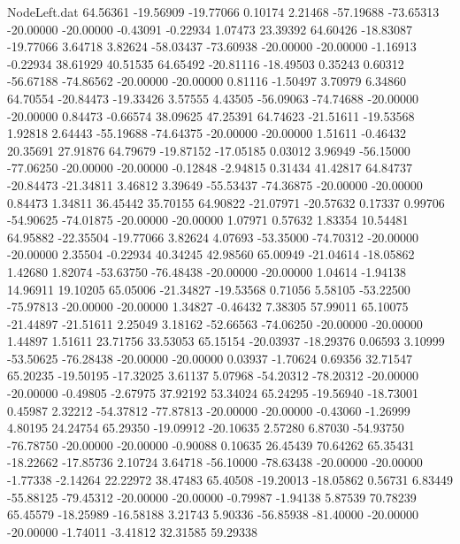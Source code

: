 \begin{filecontents}{NodeLeft.dat}
  64.56361  -19.56909  -19.77066     0.10174    2.21468  -57.19688  -73.65313  -20.00000  -20.00000   -0.43091   -0.22934    1.07473   23.39392
  64.60426  -18.83087  -19.77066     3.64718    3.82624  -58.03437  -73.60938  -20.00000  -20.00000   -1.16913   -0.22934   38.61929   40.51535
  64.65492  -20.81116  -18.49503     0.35243    0.60312  -56.67188  -74.86562  -20.00000  -20.00000    0.81116   -1.50497    3.70979    6.34860
  64.70554  -20.84473  -19.33426     3.57555    4.43505  -56.09063  -74.74688  -20.00000  -20.00000    0.84473   -0.66574   38.09625   47.25391
  64.74623  -21.51611  -19.53568     1.92818    2.64443  -55.19688  -74.64375  -20.00000  -20.00000    1.51611   -0.46432   20.35691   27.91876
  64.79679  -19.87152  -17.05185     0.03012    3.96949  -56.15000  -77.06250  -20.00000  -20.00000   -0.12848   -2.94815    0.31434   41.42817
  64.84737  -20.84473  -21.34811     3.46812    3.39649  -55.53437  -74.36875  -20.00000  -20.00000    0.84473    1.34811   36.45442   35.70155
  64.90822  -21.07971  -20.57632     0.17337    0.99706  -54.90625  -74.01875  -20.00000  -20.00000    1.07971    0.57632    1.83354   10.54481
  64.95882  -22.35504  -19.77066     3.82624    4.07693  -53.35000  -74.70312  -20.00000  -20.00000    2.35504   -0.22934   40.34245   42.98560
  65.00949  -21.04614  -18.05862     1.42680    1.82074  -53.63750  -76.48438  -20.00000  -20.00000    1.04614   -1.94138   14.96911   19.10205
  65.05006  -21.34827  -19.53568     0.71056    5.58105  -53.22500  -75.97813  -20.00000  -20.00000    1.34827   -0.46432    7.38305   57.99011
  65.10075  -21.44897  -21.51611     2.25049    3.18162  -52.66563  -74.06250  -20.00000  -20.00000    1.44897    1.51611   23.71756   33.53053
  65.15154  -20.03937  -18.29376     0.06593    3.10999  -53.50625  -76.28438  -20.00000  -20.00000    0.03937   -1.70624    0.69356   32.71547
  65.20235  -19.50195  -17.32025     3.61137    5.07968  -54.20312  -78.20312  -20.00000  -20.00000   -0.49805   -2.67975   37.92192   53.34024
  65.24295  -19.56940  -18.73001     0.45987    2.32212  -54.37812  -77.87813  -20.00000  -20.00000   -0.43060   -1.26999    4.80195   24.24754
  65.29350  -19.09912  -20.10635     2.57280    6.87030  -54.93750  -76.78750  -20.00000  -20.00000   -0.90088    0.10635   26.45439   70.64262
  65.35431  -18.22662  -17.85736     2.10724    3.64718  -56.10000  -78.63438  -20.00000  -20.00000   -1.77338   -2.14264   22.22972   38.47483
  65.40508  -19.20013  -18.05862     0.56731    6.83449  -55.88125  -79.45312  -20.00000  -20.00000   -0.79987   -1.94138    5.87539   70.78239
  65.45579  -18.25989  -16.58188     3.21743    5.90336  -56.85938  -81.40000  -20.00000  -20.00000   -1.74011   -3.41812   32.31585   59.29338

\end{filecontents}
